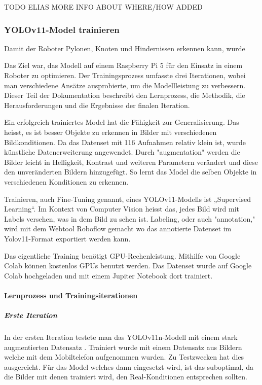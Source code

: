 TODO ELIAS MORE INFO ABOUT WHERE/HOW ADDED 




\subsubsection{YOLOv11-Model trainieren}

Damit der Roboter Pylonen, Knoten und Hindernissen erkennen kann, wurde

Das Ziel war, das Modell auf einem Raspberry Pi 5 für den Einsatz in einem Roboter zu optimieren. Der Trainingsprozess umfasste drei Iterationen, wobei man verschiedene Ansätze ausprobierte, um die Modellleistung zu verbessern. Dieser Teil der Dokumentation beschreibt den Lernprozess, die Methodik, die Herausforderungen und die Ergebnisse der finalen Iteration.

Ein erfolgreich trainiertes Model hat die Fähigkeit zur Generalisierung. Das heisst, es ist besser Objekte zu erkennen in Bilder mit verschiedenen Bildkonditionen. Da das Datenset mit 116 Aufnahmen relativ klein ist, wurde künstliche Datenerweiterung angewendet. Durch "augmentation" werden die Bilder leicht in Helligkeit, Kontrast und weiteren Parametern verändert und diese den unveränderten Bildern hinzugefügt. So lernt das Model die selben Objekte in verschiedenen Konditionen zu erkennen.

Trainieren, auch Fine-Tuning genannt, eines YOLOv11-Modells ist „Supervised Learning“. Im Kontext von Computer Vision heisst das, jedes Bild wird mit Labels versehen, was in dem Bild zu sehen ist. Labeling, oder auch "annotation," wird mit dem Webtool Roboflow gemacht wo das annotierte Datenset im Yolov11-Format exportiert werden kann. 

Das eigentliche Training benötigt GPU-Rechenleistung. Mithilfe von Google Colab können kostenlos GPUs benutzt werden. Das Datenset wurde auf Google Colab hochgeladen und mit einem Jupiter Notebook dort trainiert.

\paragraph{Lernprozess und Trainingsiterationen}

\subparagraph{Erste Iteration}

In der ersten Iteration testete man das YOLOv11n-Modell mit einem stark augmentierten Datensatz . Trainiert wurde mit einem Datensatz aus Bildern welche mit dem Mobiltelefon aufgenommen wurden. Zu Testzwecken hat dies ausgereicht. Für das Model welches dann eingesetzt wird, ist das suboptimal, da die Bilder mit denen trainiert wird, den Real-Konditionen entsprechen sollten.

